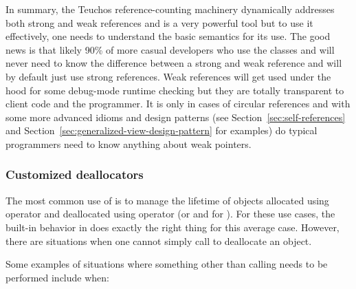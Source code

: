 \documentclass[pdf,ps2pdf,11pt]{SANDreport}
\begin{document}
In summary, the Teuchos reference-counting machinery dynamically
addresses both strong and weak references and is a very powerful tool
but to use it effectively, one needs to understand the basic semantics
for its use.  The good news is that likely 90\% of more casual
developers who use the classes {} and {} will
never need to know the difference between a strong and weak reference
and will by default just use strong references.  Weak references will
get used under the hood for some debug-mode runtime checking but they
are totally transparent to client code and the programmer.  It is only
in cases of circular references and with some more advanced idioms and
design patterns (see Section~\ref{sec:self-references} and
Section~\ref{sec:generalized-view-design-pattern} for examples) do
typical programmers need to know anything about weak pointers.


%
{}\subsubsection{Customized deallocators}
\label{sec:deallocators}
%

The most common use of {} is to manage the lifetime of
objects allocated using operator {} and deallocated using
operator {} (or {} and {} for
{}).  For these use cases, the built-in behavior in
{} does exactly the right thing for this average case.
However, there are situations when one cannot simply call
{} to deallocate an object.

Some examples of situations where something other than calling
{} needs to be performed include when:
\end{document}
